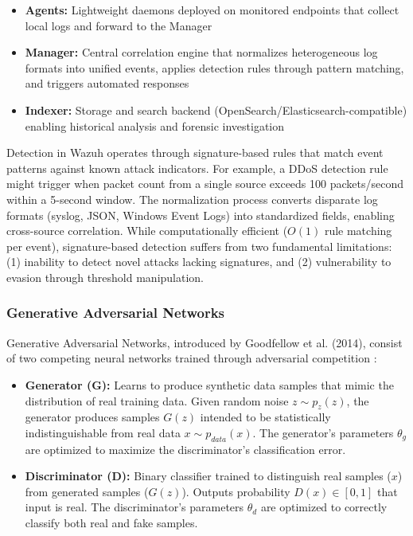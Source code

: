 \begin{itemize}
    \item \textbf{Agents:} Lightweight daemons deployed on monitored endpoints that collect local logs and forward to the Manager
    \item \textbf{Manager:} Central correlation engine that normalizes heterogeneous log formats into unified events, applies detection rules through pattern matching, and triggers automated responses
    \item \textbf{Indexer:} Storage and search backend (OpenSearch/Elasticsearch-compatible) enabling historical analysis and forensic investigation
\end{itemize}

Detection in Wazuh operates through signature-based rules that match event patterns against known attack indicators. For example, a DDoS detection rule might trigger when packet count from a single source exceeds 100 packets/second within a 5-second window. The normalization process converts disparate log formats (syslog, JSON, Windows Event Logs) into standardized fields, enabling cross-source correlation. While computationally efficient ($O(1)$ rule matching per event), signature-based detection suffers from two fundamental limitations: (1) inability to detect novel attacks lacking signatures, and (2) vulnerability to evasion through threshold manipulation.

\subsubsection{Generative Adversarial Networks}

Generative Adversarial Networks, introduced by Goodfellow et al. (2014), consist of two competing neural networks trained through adversarial competition \cite{chauhan2020}:

\begin{itemize}
    \item \textbf{Generator (G):} Learns to produce synthetic data samples that mimic the distribution of real training data. Given random noise $z \sim p_z(z)$, the generator produces samples $G(z)$ intended to be statistically indistinguishable from real data $x \sim p_{data}(x)$. The generator's parameters $\theta_g$ are optimized to maximize the discriminator's classification error.
    
    \item \textbf{Discriminator (D):} Binary classifier trained to distinguish real samples ($x$) from generated samples ($G(z)$). Outputs probability $D(x) \in [0,1]$ that input is real. The discriminator's parameters $\theta_d$ are optimized to correctly classify both real and fake samples.
\end{itemize}

